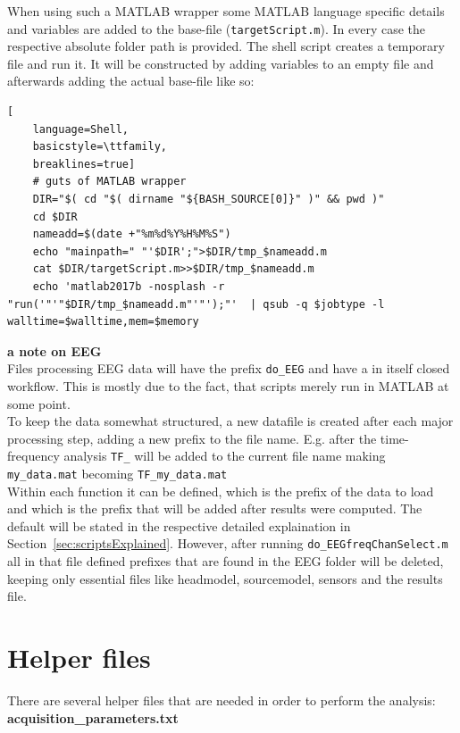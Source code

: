 \documentclass[12pt,a4paper]{scrartcl}
\begin{document}
\noindent When using such a MATLAB wrapper some MATLAB language specific details and variables are added to the base-file (\texttt{targetScript.m}). In every case the respective absolute folder path is provided. The shell script creates a temporary file and run it. It will be constructed by adding variables to an empty file and afterwards adding the actual base-file like so:
\begin{lstlisting}[
    language=Shell,
    basicstyle=\ttfamily,
    breaklines=true]
    # guts of MATLAB wrapper
    DIR="$( cd "$( dirname "${BASH_SOURCE[0]}" )" && pwd )"
    cd $DIR
    nameadd=$(date +"%m%d%Y%H%M%S")
    echo "mainpath=" "'$DIR';">$DIR/tmp_$nameadd.m
    cat $DIR/targetScript.m>>$DIR/tmp_$nameadd.m
    echo 'matlab2017b -nosplash -r "run('"'"$DIR/tmp_$nameadd.m"'"');"'  | qsub -q $jobtype -l walltime=$walltime,mem=$memory
\end{lstlisting}
\medskip
\noindent\textbf{a note on EEG}\\
\noindent Files processing EEG data will have the prefix \texttt{do\_EEG} and have a in itself closed workflow. This is mostly due to the fact, that scripts merely run in MATLAB at some point.\\
\noindent To keep the data somewhat structured, a new datafile is created after each major processing step, adding a new prefix to the file name. E.g. after the time-frequency analysis \texttt{TF\_} will be added to the current file name making \texttt{my\_data.mat} becoming \texttt{TF\_my\_data.mat}\\

\noindent Within each function it can be defined, which is the prefix of the data to load and which is the prefix that will be added after results were computed. The default will be stated in the respective detailed explaination in Section~\ref{sec:scriptsExplained}. However, after running \texttt{do\_EEGfreqChanSelect.m} all in that file defined prefixes that are found in the EEG folder will be deleted, keeping only essential files like headmodel, sourcemodel, sensors and the results file.\\

\section{Helper files}
There are several helper files that are needed in order to perform the analysis:\\

\noindent\textbf{acquisition\_parameters.txt}
\end{document}
